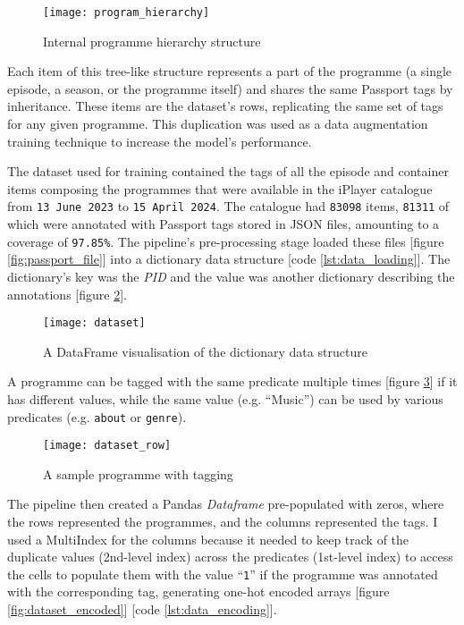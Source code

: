 \begin{figure}[h]
  \centering
  \texttt{[image: program\_hierarchy]}
  \caption{Internal programme hierarchy structure}
  \label{fig:program_hierarchy}
\end{figure}

Each item of this tree-like structure represents a part of the programme
(a single episode, a season, or the programme itself)
and shares the same Passport tags by inheritance.
These items are the dataset's rows, replicating the same set of tags for any given programme.
This duplication was used as a data augmentation training technique to increase the model's performance.

The dataset used for training contained the tags of all the episode and container items composing the programmes that were available
in the iPlayer catalogue from \verb|13 June 2023| to \verb|15 April 2024|.
The catalogue had \verb|83098| items, \verb|81311| of which were annotated with Passport tags stored in JSON files, amounting to a coverage of \verb|97.85%|.
The pipeline's pre-processing stage loaded these files [figure \ref{fig:passport_file}] into a dictionary data structure [code \ref{lst:data_loading}].
The dictionary's key was the \textit{PID} and the value was another dictionary describing the annotations [figure \ref{fig:dataset}].

\begin{figure}[h]
  \centering
  \texttt{[image: dataset]}
  \caption{A DataFrame visualisation of the dictionary data structure}
  \label{fig:dataset}
\end{figure}

A programme can be tagged with the same predicate multiple times [figure \ref{fig:dataset_row}] if it has different values,
while the same value (e.g. ``Music'') can be used by various predicates (e.g. \verb|about| or \verb|genre|).

\begin{figure}[h]
  \centering
  \texttt{[image: dataset\_row]}
  \caption{A sample programme with tagging}
  \label{fig:dataset_row}
\end{figure}

The pipeline then created a Pandas \textit{Dataframe} pre-populated with zeros,
where the rows represented the programmes, and the columns represented the tags.
I used a MultiIndex \cite{Pandas:MultiIndex} for the columns because it needed to keep track of the duplicate values (2nd-level index)
across the predicates (1st-level index) to access the cells to populate them with the value ``\verb|1|''
if the programme was annotated with the corresponding tag, generating one-hot encoded arrays [figure \ref{fig:dataset_encoded}] [code \ref{lst:data_encoding}].

